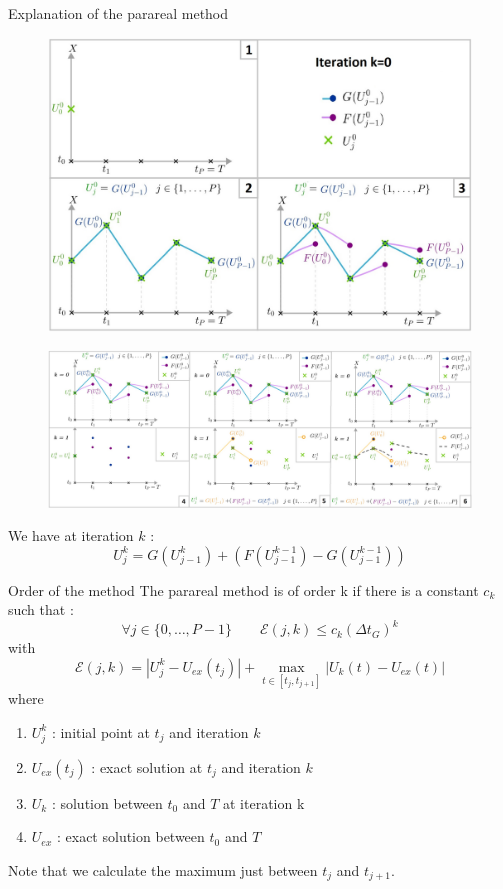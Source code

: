 \begin{frame}[allowframebreaks]{Explanation of the parareal method}
	\begin{figure}
		\centering
		\includegraphics[width=0.65\linewidth]{images/parareal/parareal_k0.jpg}
	\end{figure}
	\begin{figure}
		\centering
		\includegraphics[width=\linewidth]{images/parareal/parareal_k1.jpg}
	\end{figure}
	\small
	We have at iteration $k$ :
	$$U_j^k=G(U_{j-1}^k)+(F(U_{j-1}^{k-1})-G(U_{j-1}^{k-1}))$$
\end{frame}

\begin{frame}{Order of the method}
	The parareal method is of order k if there is a constant $c_k$ such that :
	\begin{equation*}
		\forall j\in\{0,\dots,P-1\} \qquad \mathcal{E}(j,k)\le c_k(\Delta t_G)^k
	\end{equation*}
	with
	$$\mathcal{E}(j,k)=|U_j^k-U_{ex}(t_j)|+\max_{t\in[t_j,t_{j+1}]}|U_k(t)-U_{ex}(t)|$$
	where 
	\begin{enumerate}[\textbullet]
		\item $U_j^k$ : initial point at $t_j$ and iteration $k$
		\item $U_{ex}(t_j)$ : exact solution at $t_j$ and iteration $k$
		\item $U_k$ : solution between $t_0$ and $T$ at iteration k
		\item $U_{ex}$ : exact solution between $t_0$ and $T$
	\end{enumerate}
	Note that we calculate the maximum just between $t_j$ and $t_{j+1}$.
\end{frame}

